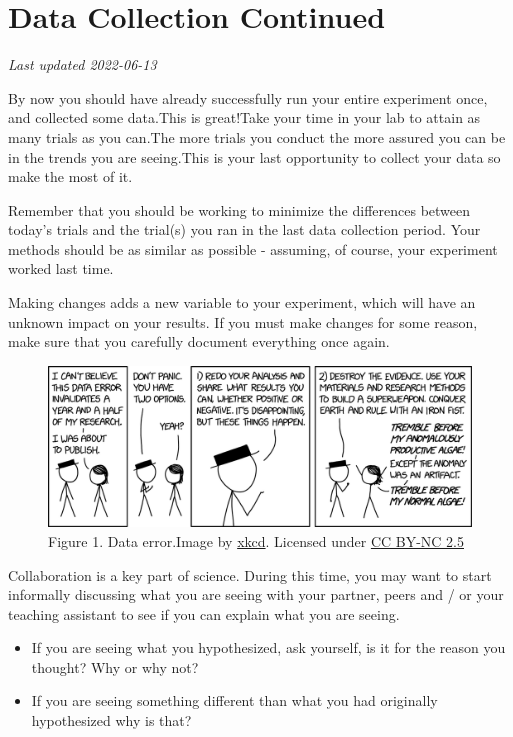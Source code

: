 \documentclass[
]{book}
\providecommand{\tightlist}{%
  \setlength{\itemsep}{0pt}\setlength{\parskip}{0pt}}
\begin{document}
\hypertarget{data-collection-continued}{%
\chapter*{Data Collection Continued}\label{data-collection-continued}}

\emph{Last updated 2022-06-13}

By now you should have already successfully run your entire experiment once, and collected some data.This is great!Take your time in your lab to attain as many trials as you can.The more trials you conduct the more assured you can be in the trends you are seeing.This is your last opportunity to collect your data so make the most of it.

Remember that you should be working to minimize the differences between today's trials and the trial(s) you ran in the last data collection period. Your methods should be as similar as possible - assuming, of course, your experiment worked last time.

Making changes adds a new variable to your experiment, which will have an unknown impact on your results. If you must make changes for some reason, make sure that you carefully document everything once again.

\begin{figure}
\centering
\includegraphics{figures_images/Lab8-Fig1.png}
\caption{Figure 1. Data error.Image by \href{https://xkcd.com/2239/}{xkcd}. Licensed under \href{https://creativecommons.org/licenses/by-nc/2.5/}{CC BY-NC 2.5}}
\end{figure}

Collaboration is a key part of science. During this time, you may want to start informally discussing what you are seeing with your partner, peers and / or your teaching assistant to see if you can explain what you are seeing.

\begin{itemize}
\tightlist
\item
  If you are seeing what you hypothesized, ask yourself, is it for the reason you thought? Why or why not?
\item
  If you are seeing something different than what you had originally hypothesized why is that?
\end{itemize}
\end{document}
